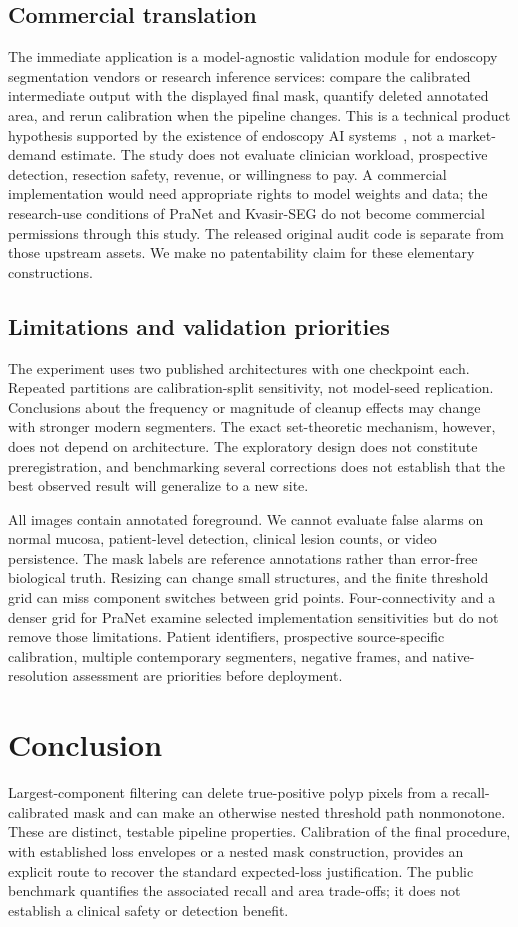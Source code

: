\documentclass[11pt,a4paper]{article}
\begin{document}
\subsection{Commercial translation}
The immediate application is a model-agnostic validation module for endoscopy segmentation vendors or research inference services: compare the calibrated intermediate output with the displayed final mask, quantify deleted annotated area, and rerun calibration when the pipeline changes. This is a technical product hypothesis supported by the existence of endoscopy AI systems~\cite{fda}, not a market-demand estimate. The study does not evaluate clinician workload, prospective detection, resection safety, revenue, or willingness to pay. A commercial implementation would need appropriate rights to model weights and data; the research-use conditions of PraNet and Kvasir-SEG do not become commercial permissions through this study. The released original audit code is separate from those upstream assets. We make no patentability claim for these elementary constructions.

\subsection{Limitations and validation priorities}
The experiment uses two published architectures with one checkpoint each. Repeated partitions are calibration-split sensitivity, not model-seed replication. Conclusions about the frequency or magnitude of cleanup effects may change with stronger modern segmenters. The exact set-theoretic mechanism, however, does not depend on architecture. The exploratory design does not constitute preregistration, and benchmarking several corrections does not establish that the best observed result will generalize to a new site.

All images contain annotated foreground. We cannot evaluate false alarms on normal mucosa, patient-level detection, clinical lesion counts, or video persistence. The mask labels are reference annotations rather than error-free biological truth. Resizing can change small structures, and the finite threshold grid can miss component switches between grid points. Four-connectivity and a denser grid for PraNet examine selected implementation sensitivities but do not remove those limitations. Patient identifiers, prospective source-specific calibration, multiple contemporary segmenters, negative frames, and native-resolution assessment are priorities before deployment.

\section{Conclusion}
Largest-component filtering can delete true-positive polyp pixels from a recall-calibrated mask and can make an otherwise nested threshold path nonmonotone. These are distinct, testable pipeline properties. Calibration of the final procedure, with established loss envelopes or a nested mask construction, provides an explicit route to recover the standard expected-loss justification. The public benchmark quantifies the associated recall and area trade-offs; it does not establish a clinical safety or detection benefit.
\end{document}
